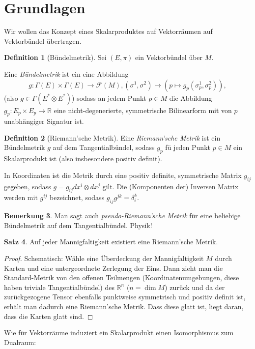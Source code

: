 \documentclass[a4paper]{scrreprt}
\numberwithin{equation}{chapter}
\newcommand{\R}{\mathbb{R}}
\newcommand{\sm}{\mathcal{F}}
\theoremstyle{definition}
\newtheorem{defn}{Definition}[section]
\newtheorem{satz}[defn]{Satz}
\newtheorem{bem}[defn]{Bemerkung}
\begin{document}
	\section{Grundlagen}
		Wir wollen das Konzept eines Skalarproduktes auf Vektorräumen auf Vektorbündel übertragen.
		\begin{defn}[Bündelmetrik]
			Sei $(E,\pi)$ ein Vektorbündel über $M$.
			
			
			Eine \emph{Bündelmetrik} ist ein eine Abbildung
			\begin{equation*}
				g\colon \Gamma(E)\times\Gamma(E)\rightarrow \sm(M), (\sigma^1,\sigma^2)\mapsto (p\mapsto g_p(\sigma^1_p,\sigma^2_p)),
			\end{equation*}
			(also $g\in\Gamma(E^*\otimes E^*)$) sodass an jedem Punkt $p\in M$ die Abbildung $g_p\colon E_p\times E_p\rightarrow \R$ eine nicht-degenerierte, symmetrische Bilinearform mit von $p$ unabhängiger Signatur ist.
		\end{defn}
		\begin{defn}[Riemann'sche Metrik]
			Eine \emph{Riemann'sche Metrik} ist ein Bündelmetrik $g$ auf dem Tangentialbündel, sodass $g_p$ fü jeden Punkt $p\in M$ ein Skalarprodukt ist (also insbesondere positiv definit).
			
			In Koordinaten ist die Metrik durch eine positiv definite, symmetrische Matrix $g_{ij}$ gegeben, sodass $g=g_{ij}dx^i\otimes dx^j$ gilt. Die (Komponenten der) Inversen Matrix werden mit $g^{ij}$ bezeichnet, sodass $g_{ij}g^{jk}=\delta^k_i$.
		\end{defn}
		\begin{bem}
			Man sagt auch \emph{pseudo-Riemann'sche Metrik} für eine beliebige Bündelmetrik auf dem Tangentialbündel. Physik!
		\end{bem}
		\begin{satz}
			Auf jeder Mannigfaltigkeit existiert eine Riemann'sche Metrik.
			\begin{proof}
				Schematisch: Wähle eine Überdeckung der Mannigfaltigkeit $M$ durch Karten und eine untergeordnete Zerlegung der Eins. Dann zieht man die Standard-Metrik von den offenen Teilmengen (Koordinatenumgebungen, diese haben triviale Tangentialbündel) des $\R^n$ ($n=\dim M$) zurück und da der zurückgezogene Tensor ebenfalls punktweise symmetrisch und positiv definit ist, erhält man dadurch eine Riemann'sche Metrik. Dass diese glatt ist, liegt daran, dass die Karten glatt sind.
			\end{proof}
		\end{satz}
		Wie für Vektorräume induziert ein Skalarprodukt einen Isomorphismus zum Dualraum:
\end{document}
